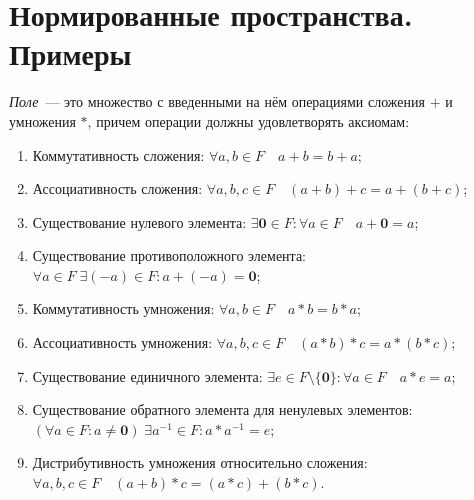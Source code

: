 \section{Нормированные пространства. Примеры}
\label{sec:q-5}
\textit{Поле}~--- это множество с введенными на нём операциями сложения $+$ и умножения $*$, причем операции должны удовлетворять аксиомам:
\begin{enumerate}
	\itemsep0em
	\item Коммутативность сложения: $\forall a,b\in F\quad a+b=b+a$;
	\item Ассоциативность сложения: $\forall a,b,c\in F\quad (a+b)+c=a+(b+c)$;
	\item Существование нулевого элемента: $\exists {\boldsymbol {0}}\in F\colon \forall a\in F\quad a+{\boldsymbol {0}}=a$;
	\item Существование противоположного элемента: $\forall a\in F\;\exists (-a)\in F\colon a+(-a)={\boldsymbol {0}}$;
	\item Коммутативность умножения: $\forall a,b\in F\quad a*b=b*a$;
	\item Ассоциативность умножения: $\forall a,b,c\in F\quad (a*b)*c=a*(b*c)$;
	\item Существование единичного элемента: ${\displaystyle \exists e\in F\setminus \{{\boldsymbol {0}}\}\colon \forall a\in F\quad a*e=a}$;
	\item Существование обратного элемента для ненулевых элементов: $(\forall a\in F\colon a\neq {\boldsymbol {0}})\;\exists a^{-1}\in F\colon a*a^{-1}=e$;
	\item Дистрибутивность умножения относительно сложения: ${\displaystyle \forall a,b,c\in F\quad (a+b)*c=(a*c)+(b*c)}$.
\end{enumerate}

